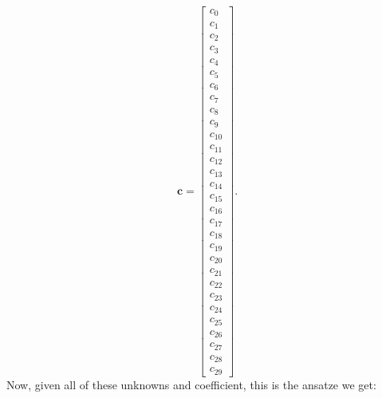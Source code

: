 \documentclass{article}
\begin{document}
\begin{equation}
\mathbf{c}=\left[\begin{matrix}c_{0}\\c_{1}\\c_{2}\\c_{3}\\c_{4}\\c_{5}\\c_{6}\\c_{7}\\c_{8}\\c_{9}\\c_{10}\\c_{11}\\c_{12}\\c_{13}\\c_{14}\\c_{15}\\c_{16}\\c_{17}\\c_{18}\\c_{19}\\c_{20}\\c_{21}\\c_{22}\\c_{23}\\c_{24}\\c_{25}\\c_{26}\\c_{27}\\c_{28}\\c_{29}\end{matrix}\right].
\end{equation}
Now, given all of these unknowns and coefficient, this is the ansatze we get:
\end{document}
